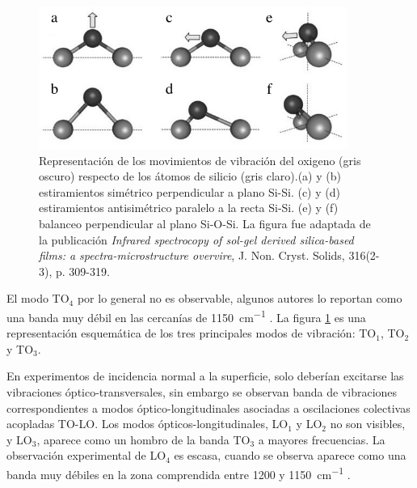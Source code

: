 		 		 \begin{figure}[!ht]
						\begin{center}
						\includegraphics[width=0.90\textwidth]{Imagenes/modos-infra.jpg}
						\caption[Modos de vibración Si-O-Si]{Representación de los movimientos de vibración del oxigeno (gris oscuro) respecto de los átomos de silicio (gris claro).(a) y (b) estiramientos simétrico perpendicular a plano Si-Si. (c) y (d) estiramientos antisimétrico paralelo a la recta Si-Si. (e) y (f) balanceo perpendicular al plano Si-O-Si. La figura fue adaptada de la publicación \textit{Infrared spectrocopy of sol-gel derived silica-based films: a spectra-microstructure overvire}, J. Non. Cryst. Solids, 316(2-3), p. 309-319. }
						\label{fig:modos-ir}
						\end{center}
						\end{figure}

		 El modo TO$_4$ por lo general no es observable, algunos autores lo reportan como una banda muy débil en las cercanías de \SI{1150}{\cm^{-1}} \cite{Pai1986,Grosse1986}. La figura \ref{fig:modos-ir} es una representación esquemática de los tres principales modos de vibración: TO$_1$, TO$_2$ y TO$_3$.

		 En experimentos de incidencia normal a la superficie, solo deberían excitarse las vibraciones óptico-transversales, sin embargo se observan banda de vibraciones correspondientes a modos óptico-longitudinales asociadas a oscilaciones colectivas acopladas TO-LO\cite{Pai1986,Grosse1986,Innocenzi2003}. Los modos ópticos-longitudinales, LO$_1$ y LO$_2$ no son visibles, y LO$_3$, aparece como un hombro de la banda TO$_3$ a mayores frecuencias. La observación experimental de LO$_4$ es escasa, cuando se observa aparece como una banda muy débiles en la zona comprendida entre 1200 y \SI{1150}{\cm^{-1}} \cite{Pai1986,Grosse1986}.
		 

